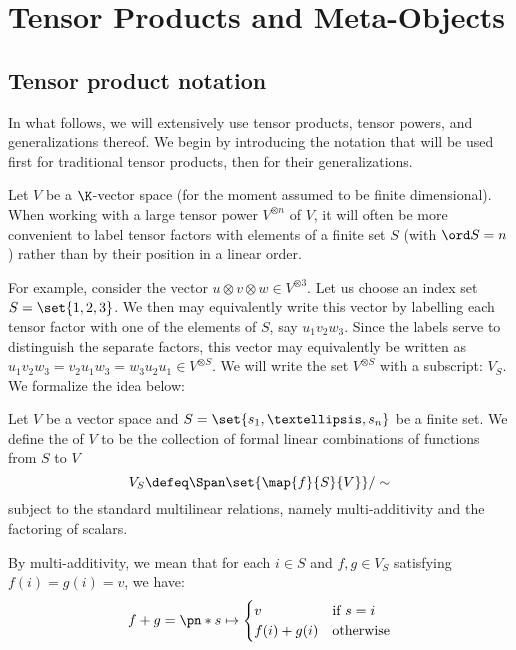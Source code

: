 \chapter{Tensor Products and Meta-Objects}
\label{ch:intro}

\section{Tensor product notation}
In what follows, we will extensively use tensor products, tensor powers, and
generalizations thereof. We begin by introducing the notation that will be used
first for traditional tensor products, then for their generalizations.

Let $V$ be a $\K$-vector space (for the moment assumed to be finite
dimensional). When working with a large tensor power $V^{\otimes n}$ of $V$, it
will often be more convenient to label tensor factors with elements of a finite
set $S$ (with $\ord S = n$) rather than by their position in a linear order.

For example, consider the vector $u \otimes v \otimes w \in V^{\otimes 3}$. Let
us choose an index set $S = \set{1,2,3}$. We then may equivalently write this
vector by labelling each tensor factor with one of the elements of $S$, say
$u_1v_2w_3$. Since the labels serve to distinguish the separate factors, this
vector may equivalently be written as $u_1v_2w_3 = v_2u_1w_3 = w_3u_2u_1 \in
V^{\otimes S}$. We will write the set $V^{\otimes S}$ with a subscript: $V_S$.
We formalize the idea below:

\begin{definition}
        Let $V$ be a vector space and $S = \set{s_1,…, s_n}$ be a finite
        set. We define the  of $V$ to be the
        collection of formal linear combinations of functions from $S$ to $V$
        \begin{equation}\label{eq:indexed_tensor}
                V_S \defeq \Span\set{\map {f} {S} {V}}/\sim
        \end{equation}
        subject to the standard multilinear relations, namely multi-additivity
        and the factoring of scalars.

        By multi-additivity, we mean that for each $i\in S$ and $f, g \in V_S$ satisfying
        $f(i) = g(i) = v$, we have:
        \begin{equation}
                \label{eq:tensor_additive}
                f + g = \pn*{
                        s \mapsto \begin{cases}
                                v & \text{if $s = i$}\\
                                f(i) + g(i) & \text{otherwise}
                        \end{cases}
                }
        \end{equation}
\end{definition}

